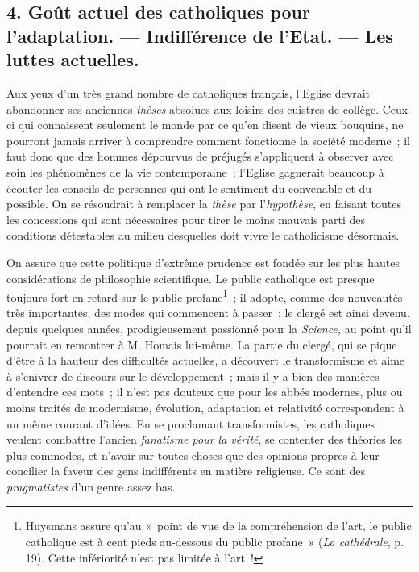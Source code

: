\documentclass[french,twoside]{book} %
\begin{document}
 \subsection[{4. Goût actuel des catholiques pour l’adaptation. — Indifférence de l’Etat. — Les luttes actuelles.}]{4. Goût actuel des catholiques pour l’adaptation. — Indifférence de l’Etat. — Les luttes actuelles.}
\label{p39}
\noindent Aux yeux d’un très grand nombre de catholiques français, l’Eglise devrait abandonner ses anciennes \emph{thèses }absolues aux loisirs des cuistres de collège. Ceux-ci qui connaissent seulement le monde par ce qu’en disent de vieux bouquins, ne pourront jamais arriver à comprendre comment fonctionne la société moderne ; il faut donc que des hommes dépourvus de préjugés s’appliquent à observer avec soin les phénomènes de la vie contemporaine ; l’Eglise gagnerait beaucoup à écouter les conseils de personnes qui ont le sentiment du convenable et du possible. On se résoudrait à remplacer la \emph{thèse} par l’\emph{hypothèse}, en faisant toutes les concessions qui sont nécessaires pour tirer le moins mauvais parti des conditions détestables au milieu desquelles doit vivre le catholicisme désormais.\par
On assure que cette politique d’extrême prudence est fondée sur les plus hautes considérations de philosophie scientifique. Le public catholique est presque toujours fort en retard sur le public profane\footnote{ \noindent Huysmans assure qu’au « point de vue de la compréhension de l’art, le public catholique est à cent pieds au-dessous du public profane » (\emph{La cathédrale}, p. 19). Cette infériorité n’est pas limitée à l’art !
 } ; il adopte, comme des nouveautés très importantes, des modes qui commencent à passer ; le clergé est ainsi devenu, depuis quelques années, prodigieusement passionné pour la \emph{Science,} au  point qu’il pourrait en remontrer à M. Homais lui-même. La partie du clergé, qui se pique d’être à la hauteur des difficultés actuelles, a découvert le transformisme et aime à s’enivrer de discours sur le développement ; mais il y a bien des manières d’entendre ces mots ; il n’est pas douteux que pour les abbés modernes, plus ou moins traités de modernisme, évolution, adaptation et relativité correspondent à un même courant d’idées. En se proclamant transformistes, les catholiques veulent combattre l’ancien \emph{fanatisme pour la vérité}, se contenter des théories les plus commodes, et n’avoir sur toutes choses que des opinions propres à leur concilier la faveur des gens indifférents en matière religieuse. Ce sont des \emph{pragmatistes} d’un genre assez bas.\par
\end{document}
